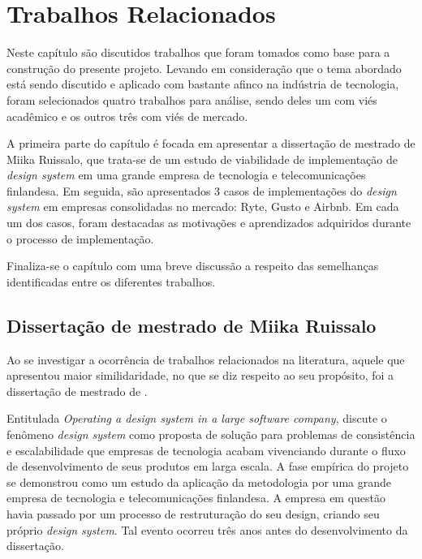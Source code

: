 
\chapter{Trabalhos Relacionados}
\label{chap:trabRelac}

Neste capítulo são discutidos trabalhos que foram tomados como base para a construção do presente projeto. Levando em consideração que o tema abordado está sendo discutido e aplicado com bastante afinco na indústria de tecnologia, foram selecionados quatro trabalhos para análise, sendo deles um com viés acadêmico e os outros três com viés de mercado. 

A primeira parte do capítulo é focada em apresentar a dissertação de mestrado de Miika Ruissalo, que trata-se de um estudo de viabilidade de implementação de \textit{design system} em uma grande empresa de tecnologia e telecomunicações finlandesa. Em seguida, são apresentados 3 casos de implementações do \textit{design system} em empresas consolidadas no mercado: Ryte, Gusto e Airbnb. Em cada um dos casos, foram destacadas as motivações e aprendizados adquiridos durante o processo de implementação.

Finaliza-se o capítulo com uma breve discussão a respeito das semelhanças identificadas entre os diferentes trabalhos.

\section{Dissertação de mestrado de Miika Ruissalo}
\label{sec:teseMestrado}

Ao se investigar a ocorrência de trabalhos relacionados na literatura, aquele que apresentou maior similidaridade, no que se diz respeito ao seu propósito, foi a dissertação de mestrado de .

Entitulada \textit{Operating a design system in a large software company},  discute o fenômeno \textit{design system} como proposta de solução para problemas de consistência e escalabilidade que empresas de tecnologia acabam vivenciando durante o fluxo de desenvolvimento de seus produtos em larga escala. A fase empírica do projeto se demonstrou como um estudo da aplicação da metodologia por uma grande empresa de tecnologia e telecomunicações finlandesa. A empresa em questão havia passado por um processo de restruturação do seu design, criando seu próprio \textit{design system}. Tal evento ocorreu três anos antes do desenvolvimento da dissertação.


